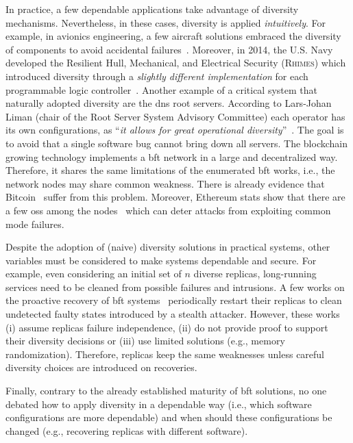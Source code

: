 In practice, a few dependable applications take advantage of diversity mechanisms. 
Nevertheless, in these cases, diversity is applied \emph{intuitively}.
For example, in avionics engineering, a few aircraft solutions embraced the diversity of components to avoid accidental failures~\cite{Yeh:2004}.
Moreover, in 2014, the U.S. Navy developed the Resilient Hull, Mechanical, and Electrical Security (\textsc{Rhimes}) which introduced diversity through a \emph{slightly different implementation} for each programmable logic controller~\cite{rhimes}.
Another example of a critical system that naturally adopted diversity are the \gls{dns} root servers. 
According to Lars-Johan Liman (chair of the Root Server System Advisory Committee) each operator has its own configurations, as ``\emph{it allows for great operational diversity}''~\cite{dns_root}. 
The goal is to avoid that a single software bug cannot bring down all servers.
The blockchain growing technology implements a \gls{bft} network in a large and decentralized way.
Therefore, it shares the same limitations of the enumerated \gls{bft} works, i.e., the network nodes may share common weakness.
There is already evidence that Bitcoin~\cite{bitcoin} suffer from this problem.
Moreover, Ethereum stats show that there are a few \glspl{os} among the nodes~\cite{Ethstats,Ethernodes} which can deter attacks from exploiting common mode failures.


Despite the adoption of (naive) diversity solutions in practical systems, other variables must be considered to make systems dependable and secure.
For example, even considering an initial set of $n$ diverse replicas, long-running services need to be cleaned from possible failures and intrusions.
A few works on the proactive recovery of \gls{bft} systems~\cite{Castro:2002,Sousa:2010,Roeder:2010,Platania:2014,Distler:2011} periodically restart their replicas to clean undetected faulty states introduced by a stealth attacker. 
However, these works (i) assume replicas failure independence, (ii) do not provide proof to support their diversity decisions or (iii) use limited solutions (e.g., memory randomization).
Therefore, replicas keep the same weaknesses unless careful diversity choices are introduced on recoveries.


Finally, contrary to the already established maturity of \gls{bft} solutions, no one debated how to apply diversity in a dependable way (i.e., which software configurations are more dependable) and when should these configurations be changed (e.g., recovering replicas with different software).

